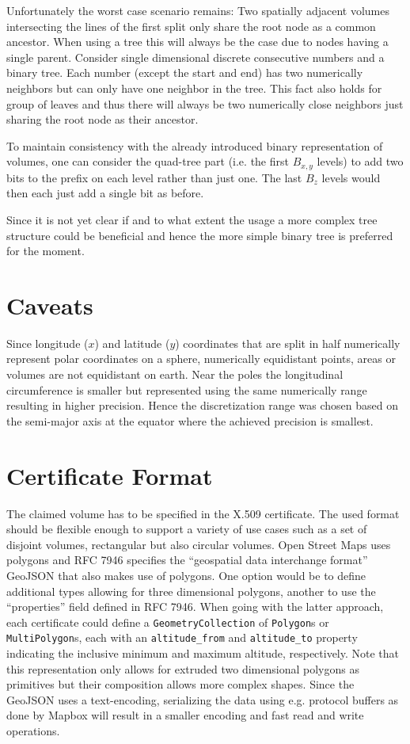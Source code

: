 \documentclass[10pt,conference,compsocconf]{IEEEtran}
\begin{document}
Unfortunately the worst case scenario remains:
Two spatially adjacent volumes intersecting the lines of the first split only share the root node as a common ancestor.
When using a tree this will always be the case due to nodes having a single parent.
Consider single dimensional discrete consecutive numbers and a binary tree.
Each number (except the start and end) has two numerically neighbors but can only have one neighbor in the tree.
This fact also holds for group of leaves and thus there will always be two numerically close neighbors just sharing the root node as their ancestor.

To maintain consistency with the already introduced binary representation of volumes, one can consider the quad-tree part (i.e. the first $B_{x,y}$ levels) to add two bits to the prefix on each level rather than just one.
The last $B_z$ levels would then each just add a single bit as before.

Since it is not yet clear if and to what extent the usage a more complex tree structure could be beneficial and hence the more simple binary tree is preferred for the moment.

\section{Caveats}
\label{sec:caveats}

Since longitude ($x$) and latitude ($y$) coordinates that are split in half numerically represent polar coordinates on a sphere, numerically equidistant points, areas or volumes are not equidistant on earth.
Near the poles the longitudinal circumference is smaller but represented using the same numerically range resulting in higher precision.
Hence the discretization range was chosen based on the semi-major axis at the equator where the achieved precision is smallest.

\section{Certificate Format}
\label{sec:certificate-format}

The claimed volume has to be specified in the X.509 certificate.
The used format should be flexible enough to support a variety of use cases such as a set of disjoint volumes, rectangular but also circular volumes.
Open Street Maps uses polygons and RFC 7946 specifies the ``geospatial data interchange format'' GeoJSON \cite{butler_geojson_2016} that also makes use of polygons.
One option would be to define additional types allowing for three dimensional polygons, another to use the ``properties'' field defined in RFC 7946.
When going with the latter approach, each certificate could define a \texttt{GeometryCollection} of \texttt{Polygon}s or \texttt{MultiPolygon}s, each with an \texttt{altitude\_from} and \texttt{altitude\_to} property indicating the inclusive minimum and maximum altitude, respectively.
Note that this representation only allows for extruded two dimensional polygons as primitives but their composition allows more complex shapes.
Since the GeoJSON uses a text-encoding, serializing the data using e.g. protocol buffers as done by Mapbox \cite{mapbox_geobuf_2023} will result in a smaller encoding and fast read and write operations.



\end{document}
